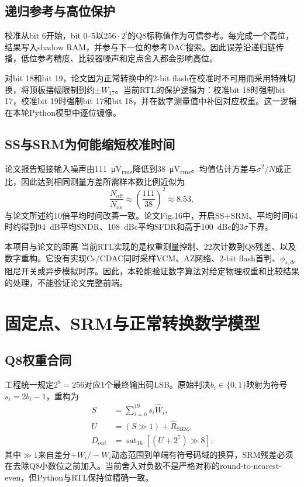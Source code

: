 \documentclass[11pt,a4paper,UTF8,fontset=none,openany]{ctexrep}
\numberwithin{equation}{chapter}
\numberwithin{figure}{chapter}
\numberwithin{table}{chapter}
\begin{document}
\section{递归参考与高位保护}

校准从bit 6开始，bit 0--5以$256\cdot 2^i$的Q8标称值作为可信参考。每完成一个高位，结果写入shadow RAM，并参与下一位的参考DAC搜索。因此误差沿递归链传播，低位参考精度、比较器噪声和定点舍入都会影响高位。

对bit 18和bit 19，论文因为正常转换中的2-bit flash在校准时不可用而采用特殊切换，将顶板摆幅限制到约$\pm W_{17}$。当前RTL的保护逻辑为：校准bit 18时强制bit 17，校准bit 19时强制bit 17和bit 18，并在数字测量值中补回对应权重。这一逻辑在本轮Python模型中逐位镜像。

\section{SS与SRM为何能缩短校准时间}

论文报告短接输入噪声由\SI{111}{\micro V_{rms}}降低到\SI{38}{\micro V_{rms}}。均值估计方差与$\sigma^2/N$成正比，因此达到相同测量方差所需样本数比例近似为
\begin{equation}
\frac{N_{\mathrm{off}}}{N_{\mathrm{on}}}
\approx\left(\frac{111}{38}\right)^2\approx 8.53,
\end{equation}
与论文所述约10倍平均时间改善一致。论文Fig.16中，开启SS+SRM、平均时间64时约得到\SI{94}{dB}平均SNDR、\SI{108}{dBc}平均SFDR和高于\SI{100}{dBc}的$3\sigma$下界。

\begin{diagnosticbox}{本项目与论文的距离}
当前RTL实现的是权重测量控制、22次计数到Q8残差、以及数字重构。它没有实现Cs/CDAC同时采样VCM、AZ网络、2-bit flash首判、$\phi_{s,dc}$阻尼开关或异步模拟时序。因此，本轮能验证数字算法对给定物理权重和比较结果的处理，不能验证论文完整前端。
\end{diagnosticbox}

\chapter{固定点、SRM与正常转换数学模型}

\section{Q8权重合同}

工程统一规定$2^8=256$对应1个最终输出码LSB。原始判决$b_i\in\{0,1\}$映射为符号$s_i=2b_i-1$，重构为
\begin{align}
S &= \sum_{i=0}^{19}s_i\widehat{W}_i,\\
U &= (S\gg 1)+\widehat{R}_{\mathrm{SRM}},\\
D_{out} &= \operatorname{sat}_{16}\left[
\left(U+2^7\right)\gg 8\right].
\end{align}
其中$\gg1$来自差分$+W_i/-W_i$动态范围到单端有符号码域的换算，SRM残差必须在去除Q8小数位之前加入。当前舍入对负数不是严格对称的round-to-nearest-even，但Python与RTL保持位精确一致。
\end{document}
